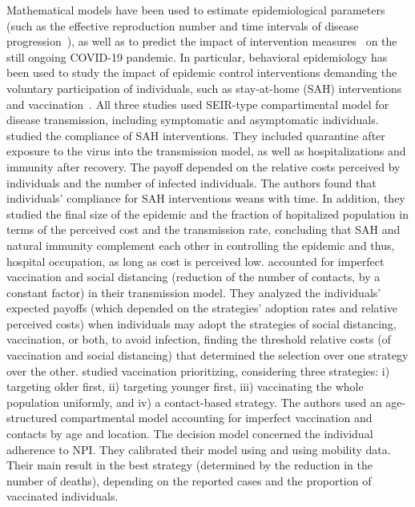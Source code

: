 Mathematical models have been used to estimate epidemiological parameters (such as the effective reproduction number and time intervals of disease progression~\cite[]{Xiang2021}), as well as to predict the impact of intervention measures~\cite[]{Xiang2021} on the still ongoing COVID-19 pandemic. In particular, behavioral epidemiology has been used to study the impact of epidemic control interventions demanding the voluntary participation of individuals, such as stay-at-home (SAH) interventions~\cite[]{Kabir2020} and vaccination~\cite[]{Choi2020,Jentsch2020}. 
%
All three studies used SEIR-type compartimental model for disease transmission, including symptomatic and asymptomatic individuals. 
%
\citet{Kabir2020} studied the compliance of SAH interventions. They included quarantine after exposure to the virus into the transmission model, as well as hospitalizations and immunity after recovery. The payoff depended on the relative costs perceived by individuals and the number of infected individuals. The authors found that individuals' compliance for SAH interventions weans with time. In addition, they studied the final size of the epidemic and the fraction of hopitalized population in terms of the perceived cost and the transmission rate, concluding that SAH and natural immunity complement each other in controlling the epidemic and thus, hospital occupation, as long as cost is perceived low. 
%
\citet{Choi2020} accounted for imperfect vaccination and social distancing (reduction of the number of contacts, by a constant factor) in their transmission model. They analyzed the individuals' expected payoffs (which depended on the strategies' adoption rates and relative perceived costs) when individuals may adopt the strategies of social distancing, vaccination, or both, to avoid infection, finding the threshold relative costs (of vaccination and social distancing) that determined the selection over one strategy over the other. 
%
\cite{Jentsch2020} studied vaccination prioritizing, considering three strategies: i) targeting older first, ii) targeting younger first, iii) vaccinating the whole population uniformly, and iv) a contact-based strategy. The authors used an age-structured compartmental model accounting for imperfect vaccination and contacts by age and location. The decision model concerned the individual adherence to NPI. They calibrated their model using and using mobility data. Their main result in the best strategy (determined by the reduction in the number of deaths), depending on the reported cases and the proportion of vaccinated individuals.

